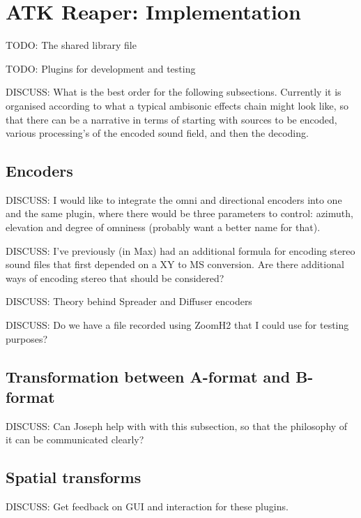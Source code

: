 \documentclass{article}
\begin{document}
\section{ATK Reaper: Implementation}

TODO: The shared library file

TODO: Plugins for development and testing

DISCUSS: What is the best order for the following subsections. Currently it is organised according to what a typical ambisonic effects chain might look like, so that there can be a narrative in terms of starting with sources to be encoded, various processing's of the encoded sound field, and then the decoding.





\subsection{Encoders}

DISCUSS: I would like to integrate the omni and directional encoders into one and the same plugin, where there would be three parameters to control: azimuth, elevation and degree of omniness (probably want a better name for that).

DISCUSS: I've previously (in Max) had an additional formula for encoding stereo sound files that first depended on a XY to MS conversion. Are there additional ways of encoding stereo that should be considered?

DISCUSS: Theory behind Spreader and Diffuser encoders

DISCUSS: Do we have a file recorded using ZoomH2 that I could use for testing purposes?




\subsection{Transformation between A-format and B-format}

DISCUSS: Can Joseph help with with this subsection, so that the philosophy of it can be communicated clearly?




\subsection{Spatial transforms}

DISCUSS: Get feedback on GUI and interaction for these plugins.
\end{document}

